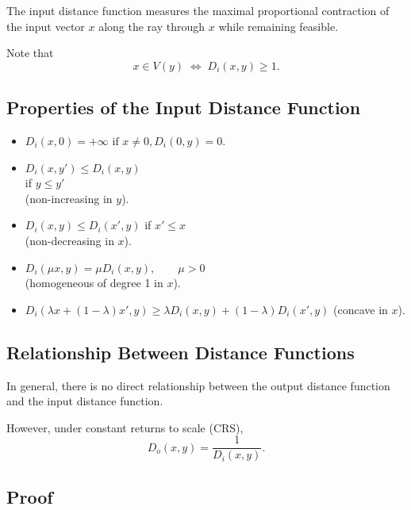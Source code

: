 \medskip

The input distance function measures the maximal proportional contraction
of the input vector $x$ along the ray through $x$ while remaining feasible.

\medskip

Note that
\[
x \in V(y) \;\Longleftrightarrow\; D_i(x,y) \ge 1.
\]

\subsection*{Properties of the Input Distance Function}

\begin{itemize}
    \item[$D_i$.1] $D_i(x,0)=+\infty \text{ if } x \ne 0, D_i(0,y)=0.$
    
    \item[$D_i$.2] $D_i(x,y') \le D_i(x,y)$\\
    if $y \le y'$\\
    (non-increasing in $y$).

    \item[$D_i$.3] $D_i(x,y) \le D_i(x',y)$ \qquad if $x' \le x$\\
    (non-decreasing in $x$).

    \item[$D_i$.4] $D_i(\mu x,y)=\mu D_i(x,y), \qquad \mu>0$\\
    (homogeneous of degree 1 in $x$).

    \item[$D_i$.5] $D_i(\lambda x+(1-\lambda)x',y) \ge \lambda D_i(x,y)+(1-\lambda)D_i(x',y)$
    (concave in $x$).
\end{itemize}

\subsection*{Relationship Between Distance Functions}

In general, there is no direct relationship between the output distance
function and the input distance function.

\medskip

However, under constant returns to scale (CRS),
\[
D_o(x,y) = \frac{1}{D_i(x,y)}.
\]





\subsection*{Proof}

